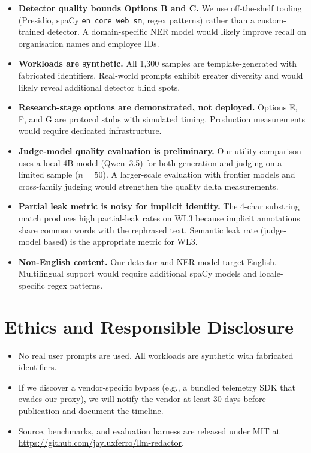 \documentclass[11pt,a4paper]{article}
\begin{document}
\begin{itemize}
  \item \textbf{Detector quality bounds Options B and C.}  We use
    off-the-shelf tooling (Presidio, spaCy
    \texttt{en\_core\_web\_sm}, regex patterns) rather than a
    custom-trained detector.  A domain-specific NER model would
    likely improve recall on organisation names and employee IDs.
  \item \textbf{Workloads are synthetic.}  All 1{,}300 samples
    are template-generated with fabricated identifiers.
    Real-world prompts exhibit greater diversity and would
    likely reveal additional detector blind spots.
  \item \textbf{Research-stage options are demonstrated, not
    deployed.}  Options E, F, and G are protocol stubs with
    simulated timing.  Production measurements would require
    dedicated infrastructure.
  \item \textbf{Judge-model quality evaluation is preliminary.}
    Our utility comparison uses a local 4B model (Qwen~3.5) for
    both generation and judging on a limited sample ($n=50$).
    A larger-scale evaluation with frontier models and
    cross-family judging would strengthen the quality delta
    measurements.
  \item \textbf{Partial leak metric is noisy for implicit
    identity.}  The 4-char substring match produces high
    partial-leak rates on WL3 because implicit annotations
    share common words with the rephrased text.  Semantic leak
    rate (judge-model based) is the appropriate metric for WL3.
  \item \textbf{Non-English content.}  Our detector and NER
    model target English.  Multilingual support would require
    additional spaCy models and locale-specific regex patterns.
\end{itemize}

\section{Ethics and Responsible Disclosure}

\begin{itemize}
  \item No real user prompts are used.  All workloads are
    synthetic with fabricated identifiers.
  \item If we discover a vendor-specific bypass (e.g., a bundled
    telemetry SDK that evades our proxy), we will notify the
    vendor at least 30 days before publication and document the
    timeline.
  \item Source, benchmarks, and evaluation harness are released
    under MIT at
    \url{https://github.com/jayluxferro/llm-redactor}.
\end{itemize}
\end{document}

